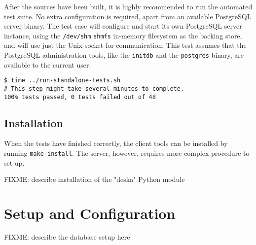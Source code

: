 \documentclass[deska]{subfiles}
\begin{document}
After the sources have been built, it is highly recommended to run the automated test suite.  No extra configuration is
required, apart from an available PostgreSQL server binary.  The test case will configure and start its own PostgreSQL
server instance, using the {\tt /dev/shm} {\tt shmfs} in-memory filesystem as the backing store, and will use just the
Unix socket for communication.  This test assumes that the PostgreSQL administration tools, like the {\tt initdb} and
the {\tt postgres} binary, are available to the current user.

\begin{verbatim}
$ time ../run-standalone-tests.sh
# This step might take several minutes to complete.
100% tests passed, 0 tests failed out of 48
\end{verbatim}

\subsection{Installation}

When the tests have finished correctly, the client tools can be installed by running {\tt make install}.  The server,
however, requires more complex procedure to set up.

FIXME: describe installation of the "deska" Python module

\section{Setup and Configuration}

FIXME: describe the database setup here
\end{document}
